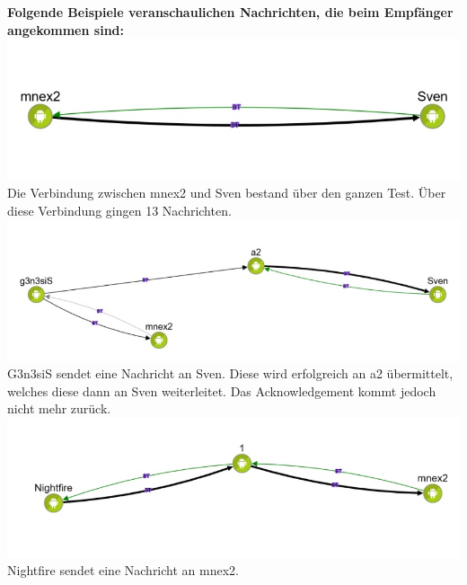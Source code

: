 \textbf{Folgende Beispiele veranschaulichen Nachrichten, die beim
Empfänger angekommen sind:}
\includegraphics{belege/grosstests/Bilder/Grosstest2/Test2Erfolg1.jpg}
Die Verbindung zwischen mnex2 und Sven bestand über den ganzen Test.
Über diese Verbindung gingen 13 Nachrichten.
\includegraphics{belege/grosstests/Bilder/Grosstest2/Test2Erfolg3.jpg}
G3n3siS sendet eine Nachricht an Sven. Diese wird erfolgreich an a2
übermittelt, welches diese dann an Sven weiterleitet. Das
Acknowledgement kommt jedoch nicht mehr zurück.
\includegraphics{belege/grosstests/Bilder/Grosstest2/Test2Erfolg4.jpg}
Nightfire sendet eine Nachricht an mnex2.

